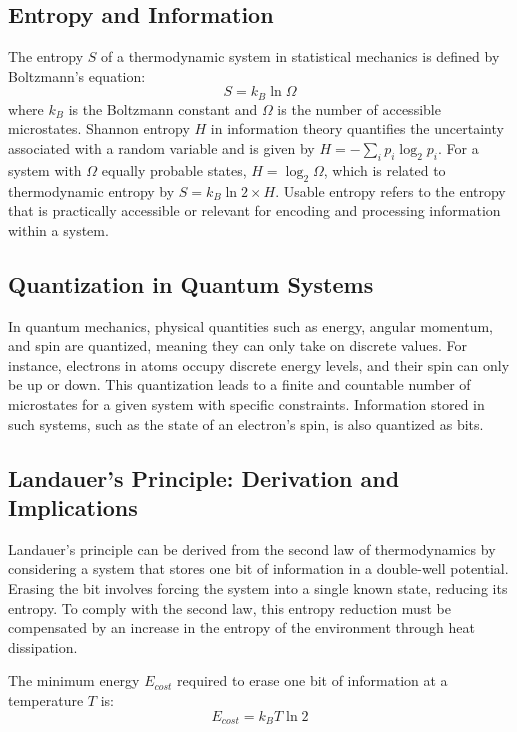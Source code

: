 	\subsection{Entropy and Information}
	The entropy $S$ of a thermodynamic system in statistical mechanics is defined by Boltzmann's equation:
	\begin{equation}
		S = k_B \ln \Omega
	\end{equation}
	where $k_B$ is the Boltzmann constant and $\Omega$ is the number of accessible microstates. Shannon entropy $H$ in information theory quantifies the uncertainty associated with a random variable and is given by $H = - \sum_i p_i \log_2 p_i$. For a system with $\Omega$ equally probable states, $H = \log_2 \Omega$, which is related to thermodynamic entropy by $S = k_B \ln 2 \times H$. Usable entropy refers to the entropy that is practically accessible or relevant for encoding and processing information within a system.
	
	\subsection{Quantization in Quantum Systems}
	In quantum mechanics, physical quantities such as energy, angular momentum, and spin are quantized, meaning they can only take on discrete values. For instance, electrons in atoms occupy discrete energy levels, and their spin can only be up or down. This quantization leads to a finite and countable number of microstates for a given system with specific constraints. Information stored in such systems, such as the state of an electron's spin, is also quantized as bits.
	
	\subsection{Landauer's Principle: Derivation and Implications}
	Landauer's principle can be derived from the second law of thermodynamics by considering a system that stores one bit of information in a double-well potential. Erasing the bit involves forcing the system into a single known state, reducing its entropy. To comply with the second law, this entropy reduction must be compensated by an increase in the entropy of the environment through heat dissipation.
	
	\begin{theorem}
		The minimum energy $E_{cost}$ required to erase one bit of information at a temperature $T$ is:
		\begin{equation}
			E_{cost} = k_B T \ln 2
		\end{equation}
	\end{theorem}
	
